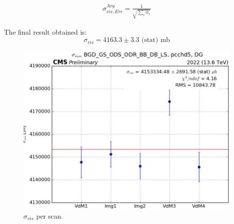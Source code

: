 \begin{eqnarray}
\sigma_{vis,Err}^{Avg}=\frac{1}{\sqrt{ \displaystyle\sum_{i} w_{i}}} 
\label{error}
\end{eqnarray}

The final result obtained is:
\begin{equation}
\sigma_{vis}=4163.3 \pm 3.3 \text{ (stat)  mb}
\end{equation}

\begin{center}
  \begin{figure}[ht]
    \centering
    \includegraphics[scale=0.40]{Chapter4/xsec_perscan_v2.png}
    \caption[$\sigma_{vis}$ average per scan and final result]{ $\sigma_{vis}$  per scan.} 
    \label{sigmavis_perscan}
  \end{figure}
\end{center}


